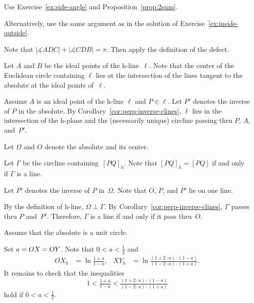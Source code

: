 
Use Exercise~\ref{ex:side-angle} and Proposition~\ref{prop:2sum}.

Alternatively, use the same argument as in the solution of Exercise~\ref{ex:inside-outside}.

Note that 
$|\measuredangle ADC|+|\measuredangle CDB|=\pi$.
Then apply the definition of the defect.

\setcounter{eqtn}{0}

Let $A$ and $B$ be the ideal points of the h-line~$\ell$. 
Note that the center of the Euclidean circle containing $\ell$ lies 
at the intersection of the lines tangent to the absolute at the ideal points of~$\ell$.

Assume $A$ is an ideal point of the h-line $\ell$
and $P\in \ell$.
Let $P'$ denotes the inverse of $P$ in the absolute.
By Corollary~\ref{cor:perp-inverse-clines},
$\ell$ lies in the intersection of the h-plane and the (necessarily unique) circline 
passing thru $P$, $A$, and~$P'$.

Let $\Omega$ and $O$ denote the absolute and its center. 

Let $\Gamma$ be the circline containing~$[PQ]_h$.
Note that $[PQ]_h=[PQ]$ if and only if $\Gamma$ is a line.

Let $P'$ denotes the inverse of $P$ in~$\Omega$.
Note that $O$, $P$, and $P'$ lie on one line.

By the definition of h-line, $\Omega\perp \Gamma$.
By Corollary~\ref{cor:perp-inverse-clines}, $\Gamma$ passes thru $P$ and~$P'$. 
Therefore, $\Gamma$
is a line if and only if it pass thru~$O$.

Assume that the absolute is a unit circle.

Set $a\z=OX\z=OY$.
Note that $0<a<\tfrac12$ and
\begin{align*}
OX_h&=\ln \tfrac{1+a}{1-a},
&
XY_h&=\ln \tfrac{(1+2\cdot a)\cdot(1-a)}{(1-2\cdot a)\cdot(1+a)}.
\end{align*}
It remains to check that the inequalities 
\[1<
\tfrac{1+a}{1-a}
<
\tfrac{(1+2\cdot a)\cdot(1-a)}{(1-2\cdot a)\cdot(1+a)}\]
hold if $0<a<\tfrac12$.

